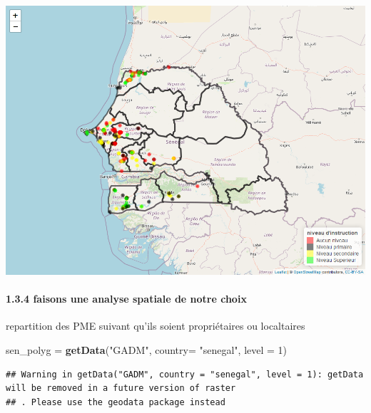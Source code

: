 \documentclass[
]{article}
\newenvironment{Shaded}{\begin{snugshade}}{\end{snugshade}}
\newcommand{\AttributeTok}[1]{\textcolor[rgb]{0.13,0.29,0.53}{#1}}
\newcommand{\DecValTok}[1]{\textcolor[rgb]{0.00,0.00,0.81}{#1}}
\newcommand{\FunctionTok}[1]{\textcolor[rgb]{0.13,0.29,0.53}{\textbf{#1}}}
\newcommand{\NormalTok}[1]{#1}
\newcommand{\OtherTok}[1]{\textcolor[rgb]{0.56,0.35,0.01}{#1}}
\newcommand{\StringTok}[1]{\textcolor[rgb]{0.31,0.60,0.02}{#1}}
\begin{document}
\includegraphics{TP-R-ESSAI_files/figure-latex/unnamed-chunk-10-1.png}

\hypertarget{faisons-une-analyse-spatiale-de-notre-choix}{%
\paragraph{1.3.4 faisons une analyse spatiale de notre
choix}\label{faisons-une-analyse-spatiale-de-notre-choix}}

repartition des PME suivant qu'ils soient propriétaires ou localtaires

\begin{Shaded}
\begin{Highlighting}[]
\NormalTok{sen\_polyg }\OtherTok{=} \FunctionTok{getData}\NormalTok{(}\StringTok{"GADM"}\NormalTok{, }\AttributeTok{country=} \StringTok{"senegal"}\NormalTok{, }\AttributeTok{level =} \DecValTok{1}\NormalTok{)}
\end{Highlighting}
\end{Shaded}

\begin{verbatim}
## Warning in getData("GADM", country = "senegal", level = 1): getData will be removed in a future version of raster
## . Please use the geodata package instead
\end{verbatim}
\end{document}
